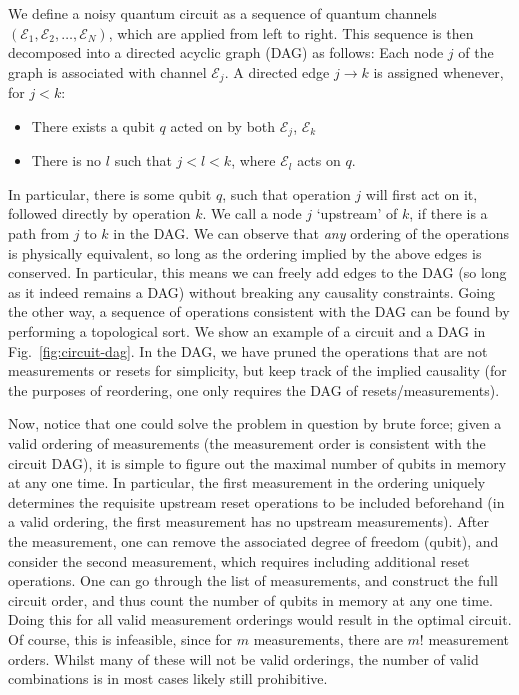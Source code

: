 We define a noisy quantum circuit as a sequence of quantum channels $(\mathcal{E}_1, \mathcal{E}_2, \dots, \mathcal{E}_N)$, which are applied from left to right. This sequence is then decomposed into a directed acyclic graph (DAG) as follows: Each node $j$ of the graph is associated with channel $\mathcal{E}_j$. A directed edge $j \rightarrow k$ is assigned whenever, for $j<k$:
\begin{itemize}
    \item There exists a qubit $q$ acted on by both $\mathcal{E}_j$, $\mathcal{E}_k$
    \item There is no $l$ such that $j < l < k$, where $\mathcal{E}_l$ acts on $q$.
\end{itemize}
In particular, there is some qubit $q$, such that operation $j$ will first act on it, followed directly by operation $k$. We call a node $j$ `upstream' of $k$, if there is a path from $j$ to $k$ in the DAG. 
We can observe that \textit{any} ordering of the operations is physically equivalent, so long as the ordering implied by the above edges is conserved. In particular, this means we can freely add edges to the DAG (so long as it indeed remains a DAG) without breaking any causality constraints. Going the other way, a sequence of operations consistent with the DAG can be found by performing a topological sort.
We show an example of a circuit and a DAG in Fig.~\ref{fig:circuit-dag}. In the DAG, we have pruned the operations that are not measurements or resets for simplicity, but keep track of the implied causality (for the purposes of reordering, one only requires the DAG of resets/measurements).

Now, notice that one could solve the problem in question by brute force; given a valid ordering of measurements (the measurement order is consistent with the circuit DAG), it is simple to figure out the maximal number of qubits in memory at any one time. In particular, the first measurement in the ordering uniquely determines the requisite upstream reset operations to be included beforehand (in a valid ordering, the first measurement has no upstream measurements). After the measurement, one can remove the associated degree of freedom (qubit), and consider the second measurement, which requires including additional reset operations. One can go through the list of measurements, and construct the full circuit order, and thus count the number of qubits in memory at any one time. Doing this for all valid measurement orderings would result in the optimal circuit. Of course, this is infeasible, since for $m$ measurements, there are $m!$ measurement orders. Whilst many of these will not be valid orderings, the number of valid combinations is in most cases likely still prohibitive.

